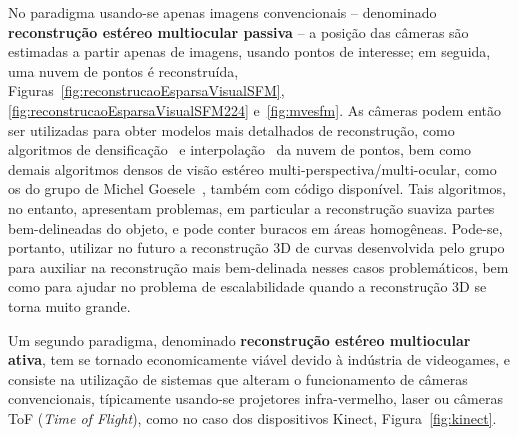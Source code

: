 No paradigma usando-se apenas imagens convencionais -- denominado
\textbf{reconstrução estéreo multiocular passiva} --  a posição das câmeras são
estimadas a partir apenas de imagens, usando pontos de interesse; em seguida, uma
nuvem de pontos é reconstruída, Figuras~\ref{fig:reconstrucaoEsparsaVisualSFM}, \ref{fig:reconstrucaoEsparsaVisualSFM224}
e~\ref{fig:mvesfm}.
As câmeras podem então ser utilizadas para obter modelos mais detalhados de
reconstrução, como algoritmos de densificação~\cite{furukawa2007dense} e
interpolação~\cite{poisson} da nuvem de pontos, bem como demais algoritmos
densos de visão estéreo multi-perspectiva/multi-ocular, como os do grupo de
Michel Goesele~\cite{mve}, também com código disponível. Tais algoritmos, no
entanto, apresentam problemas, em particular a reconstrução suaviza partes
bem-delineadas do objeto, e pode conter buracos em áreas homogêneas. Pode-se,
portanto, utilizar no futuro a reconstrução 3D de curvas 
desenvolvida pelo grupo~\cite{Usumezbas:Fabbri:Kimia:ECCV16,Fabbri:Kimia:IJCV2016,Fabbri:Kimia:CVPR10,Fabbri:Giblin:Kimia:ECCV12}
para auxiliar na reconstrução mais bem-delinada nesses casos problemáticos, bem
como para ajudar no problema de escalabilidade quando a reconstrução 3D se torna
muito grande.  

Um segundo paradigma, denominado \textbf{reconstrução estéreo
multiocular ativa}, tem se tornado economicamente viável devido à indústria de videogames, e
consiste na utilização de sistemas que alteram o funcionamento de câmeras
convencionais, típicamente usando-se projetores infra-vermelho, laser ou câmeras
ToF (\emph{Time of Flight}), como no caso dos dispositivos Kinect,
Figura~\ref{fig:kinect}.

